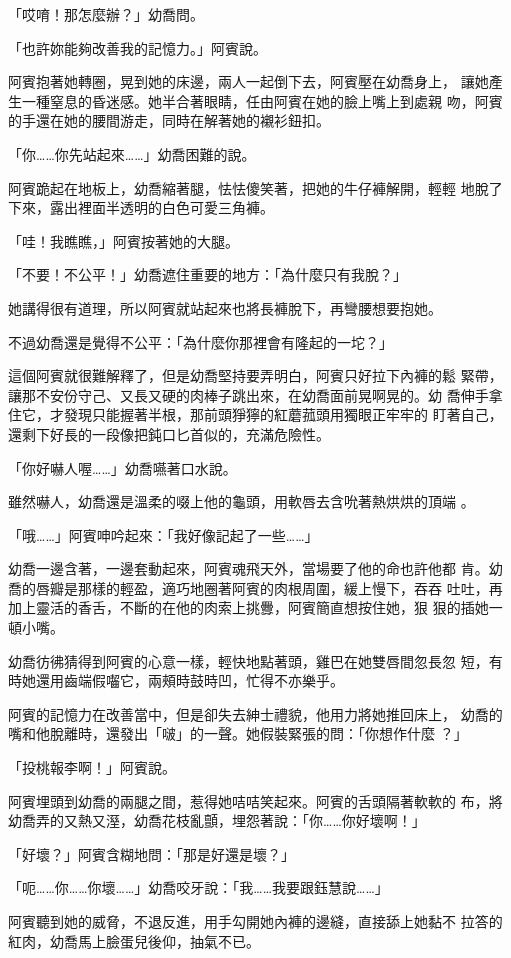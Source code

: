 「哎唷！那怎麼辦？」幼喬問。

「也許妳能夠改善我的記憶力。」阿賓說。

阿賓抱著她轉圈，晃到她的床邊，兩人一起倒下去，阿賓壓在幼喬身上，
讓她產生一種窒息的昏迷感。她半合著眼睛，任由阿賓在她的臉上嘴上到處親
吻，阿賓的手還在她的腰間游走，同時在解著她的襯衫鈕扣。

「你……你先站起來……」幼喬困難的說。

阿賓跪起在地板上，幼喬縮著腿，怯怯傻笑著，把她的牛仔褲解開，輕輕
地脫了下來，露出裡面半透明的白色可愛三角褲。

「哇！我瞧瞧，」阿賓按著她的大腿。

「不要！不公平！」幼喬遮住重要的地方：「為什麼只有我脫？」

她講得很有道理，所以阿賓就站起來也將長褲脫下，再彎腰想要抱她。

不過幼喬還是覺得不公平：「為什麼你那裡會有隆起的一坨？」

這個阿賓就很難解釋了，但是幼喬堅持要弄明白，阿賓只好拉下內褲的鬆
緊帶，讓那不安份守己、又長又硬的肉棒子跳出來，在幼喬面前晃啊晃的。幼
喬伸手拿住它，才發現只能握著半根，那前頭猙獰的紅蘑菰頭用獨眼正牢牢的
盯著自己，還剩下好長的一段像把鈍口匕首似的，充滿危險性。

「你好嚇人喔……」幼喬嚥著口水說。

雖然嚇人，幼喬還是溫柔的啜上他的龜頭，用軟唇去含吮著熱烘烘的頂端
。

「哦……」阿賓呻吟起來：「我好像記起了一些……」

幼喬一邊含著，一邊套動起來，阿賓魂飛天外，當場要了他的命也許他都
肯。幼喬的唇瓣是那樣的輕盈，適巧地圈著阿賓的肉根周圍，緩上慢下，吞吞
吐吐，再加上靈活的香舌，不斷的在他的肉索上挑釁，阿賓簡直想按住她，狠
狠的插她一頓小嘴。

幼喬彷彿猜得到阿賓的心意一樣，輕快地點著頭，雞巴在她雙唇間忽長忽
短，有時她還用齒端假囓它，兩頰時鼓時凹，忙得不亦樂乎。

阿賓的記憶力在改善當中，但是卻失去紳士禮貌，他用力將她推回床上，
幼喬的嘴和他脫離時，還發出「啵」的一聲。她假裝緊張的問：「你想作什麼
？」

「投桃報李啊！」阿賓說。

阿賓埋頭到幼喬的兩腿之間，惹得她咭咭笑起來。阿賓的舌頭隔著軟軟的
布，將幼喬弄的又熱又溼，幼喬花枝亂顫，埋怨著說：「你……你好壞啊！」

「好壞？」阿賓含糊地問：「那是好還是壞？」

「呃……你……你壞……」幼喬咬牙說：「我……我要跟鈺慧說……」

阿賓聽到她的威脅，不退反進，用手勾開她內褲的邊縫，直接舔上她黏不
拉答的紅肉，幼喬馬上臉蛋兒後仰，抽氣不已。

